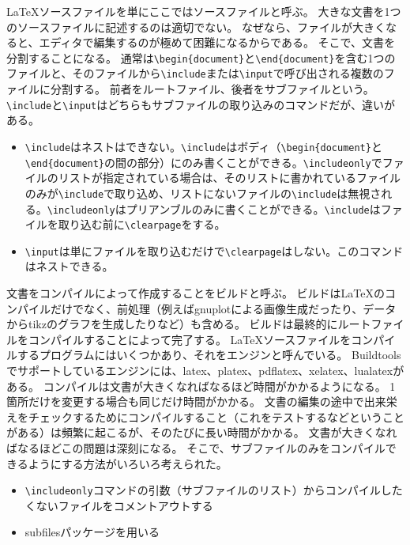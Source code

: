 LaTeXソースファイルを単にここではソースファイルと呼ぶ。
大きな文書を1つのソースファイルに記述するのは適切でない。
なぜなら、ファイルが大きくなると、エディタで編集するのが極めて困難になるからである。
そこで、文書を分割することになる。
通常は\texttt{\textbackslash{}begin\{document\}}と\texttt{\textbackslash{}end\{document\}}を含む1つのファイルと、そのファイルから\texttt{\textbackslash{}include}または\texttt{\textbackslash{}input}で呼び出される複数のファイルに分割する。
前者をルートファイル、後者をサブファイルという。
\texttt{\textbackslash{}include}と\texttt{\textbackslash{}input}はどちらもサブファイルの取り込みのコマンドだが、違いがある。

\begin{itemize}
\tightlist
\item
  \texttt{\textbackslash{}include}はネストはできない。\texttt{\textbackslash{}include}はボディ（\texttt{\textbackslash{}begin\{document\}}と\texttt{\textbackslash{}end\{document\}}の間の部分）にのみ書くことができる。\texttt{\textbackslash{}includeonly}でファイルのリストが指定されている場合は、そのリストに書かれているファイルのみが\texttt{\textbackslash{}include}で取り込め、リストにないファイルの\texttt{\textbackslash{}include}は無視される。\texttt{\textbackslash{}includeonly}はプリアンブルのみに書くことができる。\texttt{\textbackslash{}include}はファイルを取り込む前に\texttt{\textbackslash{}clearpage}をする。
\item
  \texttt{\textbackslash{}input}は単にファイルを取り込むだけで\texttt{\textbackslash{}clearpage}はしない。このコマンドはネストできる。
\end{itemize}

文書をコンパイルによって作成することをビルドと呼ぶ。
ビルドはLaTeXのコンパイルだけでなく、前処理（例えばgnuplotによる画像生成だったり、データからtikzのグラフを生成したりなど）も含める。
ビルドは最終的にルートファイルをコンパイルすることによって完了する。
LaTeXソースファイルをコンパイルするプログラムにはいくつかあり、それをエンジンと呼んでいる。
Buildtoolsでサポートしているエンジンには、latex、platex、pdflatex、xelatex、lualatexがある。
コンパイルは文書が大きくなればなるほど時間がかかるようになる。
1箇所だけを変更する場合も同じだけ時間がかかる。
文書の編集の途中で出来栄えをチェックするためにコンパイルすること（これをテストするなどということがある）は頻繁に起こるが、そのたびに長い時間がかかる。
文書が大きくなればなるほどこの問題は深刻になる。
そこで、サブファイルのみをコンパイルできるようにする方法がいろいろ考えられた。

\begin{itemize}
\tightlist
\item
  \texttt{\textbackslash{}includeonly}コマンドの引数（サブファイルのリスト）からコンパイルしたくないファイルをコメントアウトする
\item
  subfilesパッケージを用いる
\end{itemize}

